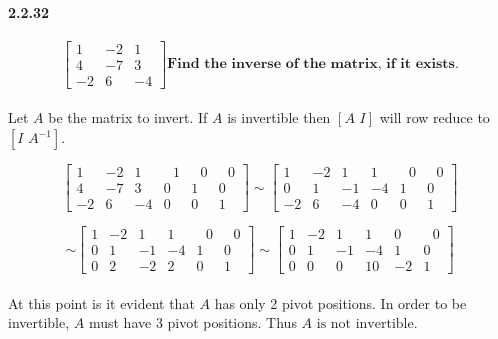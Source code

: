 \documentclass[12pt, oneside]{article}   	%
\begin{document}
\paragraph*{\textbf{2.2.32}}
\[   \left[ \begin{array}{rrr}
1&-2&1\\
4&-7&3\\
-2&6&-4\end{array}\right ] \textbf{Find the inverse of the matrix, if it exists.}\]

\paragraph{}
Let $A$ be the matrix to invert. If $A$ is invertible then $[A \,\,I]$ will row reduce to $[I\,\,A^{-1}]$.

\[ \left[ \begin{array}{rrrrrrr}
1&-2&1&\,\,\,\,1&\,\,\,\,0&\,\,\,\,0\\
4&-7&3&0&1&0\\
-2&6&-4&0&0&1\end{array}\right ]\sim
\left[ \begin{array}{rrrrrrr}
1&-2&1&1&\,\,\,\,0&\,\,\,\,0\\
0&1&-1&-4&1&0\\
-2&6&-4&0&0&1\end{array}\right ] \]

\[\sim\left[ \begin{array}{rrrrrrr}
1&-2&1&1&\,\,\,\,0&\,\,\,\,0\\
0&1&-1&-4&1&0\\
0&2&-2&2&0&1\end{array}\right ]\sim
\left[ \begin{array}{rrrrrrr}
1&-2&1&1&0&\,\,\,\,0\\
0&1&-1&-4&1&0\\
0&0&0&10&-2&1\end{array}\right ] \]

\paragraph{}At this point is it evident that $A$ has only 2 pivot positions. In order to be invertible, $A$ must have 3 pivot positions. Thus $\boxed{A\textrm{ is not invertible}}$.
\end{document}
